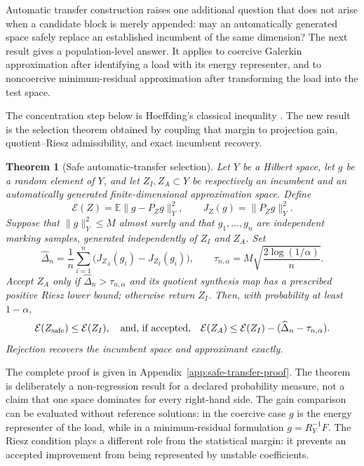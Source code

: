 \documentclass[11pt]{article}
\newtheorem{theorem}{Theorem}[section]
\numberwithin{algorithm}{section}
\theoremstyle{definition}\newtheorem{definition}[theorem]{Definition}
\theoremstyle{remark}\newtheorem{remark}[theorem]{Remark}
\begin{document}
Automatic transfer construction raises one additional question that does not
arise when a candidate block is merely appended: may an automatically generated
space safely replace an established incumbent of the same dimension?  The next
result gives a population-level answer.  It applies to coercive Galerkin
approximation after identifying a load with its energy representer, and to
noncoercive minimum-residual approximation after transforming the load into the
test space.

The concentration step below is Hoeffding's classical inequality
\cite{hoeffding1963}.  The new result is the selection theorem obtained by
coupling that margin to projection gain, quotient--Riesz admissibility, and
exact incumbent recovery.

\begin{theorem}[Safe automatic-transfer selection]
\label{thm:safe-automatic-transfer}
Let $Y$ be a Hilbert space, let $g$ be a random element of $Y$, and let
$Z_I,Z_A\subset Y$ be respectively an incumbent and an automatically generated
finite-dimensional approximation space.  Define
\[
 \mathcal E(Z)=\mathbb E\|g-P_Zg\|_Y^2,
 \qquad J_Z(g)=\|P_Zg\|_Y^2.
\]
Suppose that $\|g\|_Y^2\leq M$ almost surely and that
$g_1,\ldots,g_n$ are independent marking samples, generated independently of
$Z_I$ and $Z_A$.  Set
\[
 \widehat\Delta_n=\frac{1}{n}\sum_{i=1}^n
       \bigl(J_{Z_A}(g_i)-J_{Z_I}(g_i)\bigr),\qquad
 \tau_{n,\alpha}=M\sqrt{\frac{2\log(1/\alpha)}{n}}.
\]
Accept $Z_A$ only if $\widehat\Delta_n>\tau_{n,\alpha}$ and its quotient
synthesis map has a prescribed positive Riesz lower bound; otherwise return
$Z_I$.  Then, with probability at least $1-\alpha$,
\begin{equation}
 \mathcal E(Z_{\rm safe})\leq \mathcal E(Z_I),
 \quad\hbox{and, if accepted,}\quad
 \mathcal E(Z_A)\leq\mathcal E(Z_I)
       -(\widehat\Delta_n-\tau_{n,\alpha}).
 \label{eq:safe-transfer-nonregression}
\end{equation}
Rejection recovers the incumbent space and approximant exactly.
\end{theorem}

The complete proof is given in Appendix~\ref{app:safe-transfer-proof}.  The
theorem is deliberately a non-regression result for a declared probability
measure, not a claim that one space dominates for every right-hand side.  The
gain comparison can be evaluated without reference solutions: in the coercive
case $g$ is the energy representer of the load, while in a minimum-residual
formulation $g=R_Y^{-1}F$.  The Riesz condition plays a different role from
the statistical margin: it prevents an accepted improvement from being
represented by unstable coefficients.
\end{document}
